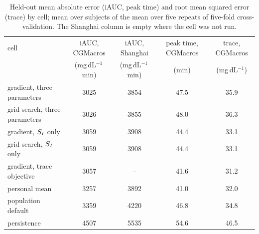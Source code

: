 \begin{table}[t]
\centering\small
\begin{tabular}{lcccc}
\toprule
cell & iAUC, CGMacros & iAUC, Shanghai & peak time, CGMacros & trace, CGMacros \\
 & (mg\,dL$^{-1}$\,min) & (mg\,dL$^{-1}$\,min) & (min) & (mg\,dL$^{-1}$) \\
\midrule
gradient, three parameters & 3025 & 3854 & 47.5 & 35.9 \\
grid search, three parameters & 3026 & 3855 & 48.0 & 36.3 \\
gradient, $S_I$ only & 3059 & 3908 & 44.4 & 33.1 \\
grid search, $S_I$ only & 3059 & 3908 & 44.4 & 33.1 \\
gradient, trace objective & 3057 & -- & 41.6 & 31.2 \\
personal mean & 3257 & 3892 & 41.0 & 32.0 \\
population default & 3359 & 4220 & 46.8 & 34.8 \\
persistence & 4507 & 5535 & 54.6 & 46.5 \\
\bottomrule
\end{tabular}
\caption{Held-out mean absolute error (iAUC, peak time) and root mean squared error (trace) by cell; mean over subjects of the mean over five repeats of five-fold cross-validation. The Shanghai column is empty where the cell was not run.}
\label{tab:prediction}
\end{table}
